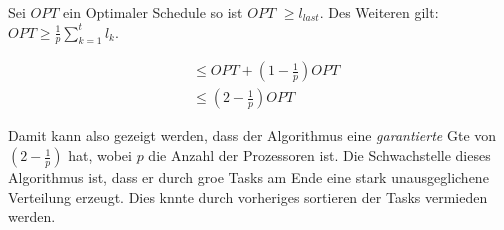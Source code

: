 \documentclass[12pt, a4paper, twoside]{scrartcl}
\begin{document}
Sei $OPT$ ein Optimaler Schedule so ist $OPT$ $\geq l_{last}$. Des Weiteren gilt: $OPT \geq \frac{1}{p} \sum_{k = 1}^{t}  l_{k}$.

\begin{align}
	& \leq OPT + \left(1 - \frac{1}{p}\right) OPT\\
	& \leq \left(2 - \frac{1}{p}\right)OPT
\end{align}

Damit kann also gezeigt werden, dass der Algorithmus eine \emph{garantierte} Gte von $\left(2-\frac{1}{p}\right)$ hat, wobei $p$ die Anzahl der Prozessoren ist. Die Schwachstelle dieses Algorithmus ist, dass er durch groe Tasks am Ende eine stark unausgeglichene Verteilung erzeugt. Dies knnte durch vorheriges sortieren der Tasks vermieden werden.

\vfill
\bibdata
\vfill 
\cleardoublepage {} 
\def\bibname{Literatur}  

%


\end{document}
